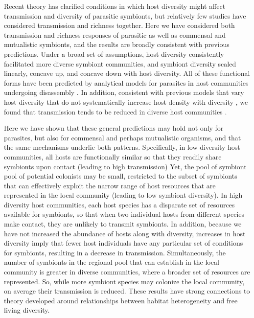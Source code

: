 \documentclass[12pt]{article}
\begin{document}
Recent theory has clarified conditions in which host diversity might affect transmission and diversity of parasitic symbionts, but relatively few studies have considered transmission and richness together. 
Here we have considered both transmission and richness responses of parasitic as well as commensal and mutualistic symbionts, and the results are broadly consistent with previous predictions. 
Under a broad set of assumptions, host diversity consistently facilitated more diverse symbiont communities, and symbiont diversity scaled linearly, concave up, and concave down with host diversity. 
All of these functional forms have been predicted by analytical models for parasites in host communities undergoing disassembly \cite{Lafferty2012}. 
In addition, consistent with previous models that vary host diversity that do not systematically increase host density with diversity \citep{Mihaljevic2014}, we found that transmission tends to be reduced in diverse host communities \citep{Dobson2004a, Rudolf2005, Roche2012, Joseph2013a, Mihaljevic2014}.

Here we have shown that these general predictions may hold not only for parasites, but also for commensal and perhaps mutualistic organisms, and that the same mechanisms underlie both patterns. 
Specifically, in low diversity host communities, all hosts are functionally similar so that they readily share symbionts upon contact (leading to high transmission)
 Yet, the pool of symbiont pool of potential colonists may be small, restricted to the subset of symbionts that can effectively exploit the narrow range of host resources that are represented in the local community (leading to low symbiont diversity). 
In high diversity host communities, each host species has a disparate set of resources available for symbionts, so that when two individual hosts from different species make contact, they are unlikely to transmit symbionts. 
In addition, because we have not increased the abundance of hosts along with diversity, increases in host diversity imply that fewer host individuals have any particular set of conditions for symbionts, resulting in a decrease in transmission. 
Simultaneously, the number of symbionts in the regional pool that can establish in the local community is greater in diverse communities, where a broader set of resources are represented. 
So, while more symbiont species may colonize the local community, on average their transmission is reduced. 
These results have strong connections to theory developed around relationships between habitat heterogeneity and free living diversity. 
\end{document}
